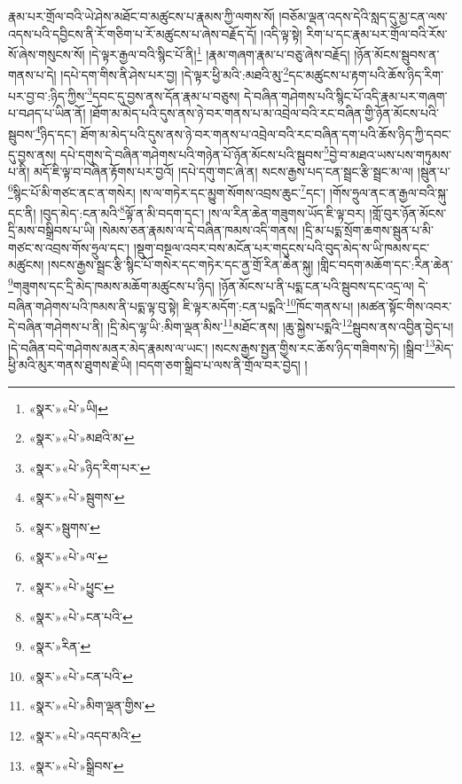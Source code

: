 རྣམ་པར་གྲོལ་བའི་ཡེ་ཤེས་མཐོང་བ་མཚུངས་པ་རྣམས་ཀྱི་ལགས་སོ། །བཅོམ་ལྡན་འདས་དེའི་སླད་དུ་མྱ་ངན་ལས་འདས་པའི་དབྱིངས་ནི་རོ་གཅིག་པ་རོ་མཚུངས་པ་ཞེས་བརྗོད་དོ། །འདི་ལྟ་སྟེ། རིག་པ་དང་རྣམ་པར་གྲོལ་བའི་རོས་སོ་ཞེས་གསུངས་སོ། །དེ་ལྟར་རྒྱལ་བའི་སྙིང་པོ་ནི།\footnote{«སྣར་»«པེ་»ཡི།} །རྣམ་གཞག་རྣམ་པ་བཅུ་ཞེས་བརྗོད། །ཉོན་མོངས་སྦུབས་ན་གནས་པ་དེ། །དཔེ་དག་གིས་ནི་ཤེས་པར་བྱ། །དེ་ལྟར་ཕྱི་མའི་:མཐའི་མུ་\footnote{«སྣར་»«པེ་»མཐའི་མ་}དང་མཚུངས་པ་རྟག་པའི་ཆོས་ཉིད་རིག་པར་བྱ་བ་:ཉིད་ཀྱིས་\footnote{«སྣར་»«པེ་»ཉིད་རིག་པར་}དབང་དུ་བྱས་ནས་དོན་རྣམ་པ་བཅུས། དེ་བཞིན་གཤེགས་པའི་སྙིང་པོ་འདི་རྣམ་པར་གཞག་པ་བཤད་པ་ཡིན་ནོ། །ཐོག་མ་མེད་པའི་དུས་ནས་ཉེ་བར་གནས་པ་མ་འབྲེལ་བའི་རང་བཞིན་གྱི་ཉོན་མོངས་པའི་སྦུབས་\footnote{«སྣར་»«པེ་»སྦུགས་}ཉིད་དང་། ཐོག་མ་མེད་པའི་དུས་ནས་ཉེ་བར་གནས་པ་འབྲེལ་བའི་རང་བཞིན་དག་པའི་ཆོས་ཉིད་ཀྱི་དབང་དུ་བྱས་ནས། དཔེ་དགུས་དེ་བཞིན་གཤེགས་པའི་གཉེན་པོ་ཉོན་མོངས་པའི་སྦུབས་\footnote{«སྣར་»སྦུགས་}བྱེ་བ་མཐའ་ཡས་པས་གཏུམས་པ་ནི། མདོ་ཇི་ལྟ་བ་བཞིན་རྟོགས་པར་བྱའོ། །དཔེ་དགུ་གང་ཞེ་ན། སངས་རྒྱས་པད་ངན་སྦྲང་རྩི་སྦྲང་མ་ལ། །སྦུན་པ་\footnote{«སྣར་»«པེ་»ལ་}སྙིང་པོ་མི་གཙང་ནང་ན་གསེར། །ས་ལ་གཏེར་དང་མྱུག་སོགས་འབྲས་ཆུང་\footnote{«སྣར་»«པེ་»ཕྱུང་}དང་། །གོས་ཧྲུལ་ནང་ན་རྒྱལ་བའི་སྐུ་དང་ནི། །བུད་མེད་:ངན་མའི་\footnote{«སྣར་»«པེ་»ངན་པའི་}ལྟོ་ན་མི་བདག་དང་། །ས་ལ་རིན་ཆེན་གཟུགས་ཡོད་ཇི་ལྟ་བར། །གློ་བུར་ཉོན་མོངས་དྲི་མས་བསྒྲིབས་པ་ཡི། །སེམས་ཅན་རྣམས་ལ་དེ་བཞིན་ཁམས་འདི་གནས། །དྲི་མ་པདྨ་སྲོག་ཆགས་སྦུན་པ་མི་གཙང་ས་འབྲས་གོས་ཧྲུལ་དང་། །སྡུག་བསྔལ་འབར་བས་མངོན་པར་གདུངས་པའི་བུད་མེད་ས་ཡི་ཁམས་དང་མཚུངས། །སངས་རྒྱས་སྦྲང་རྩི་སྙིང་པོ་གསེར་དང་གཏེར་དང་ནྱ་གྲོ་རིན་ཆེན་སྐུ། །གླིང་བདག་མཆོག་དང་:རིན་ཆེན་\footnote{«སྣར་»རིན་}གཟུགས་དང་དྲི་མེད་ཁམས་མཆོག་མཚུངས་པ་ཉིད། །ཉོན་མོངས་པ་ནི་པདྨ་ངན་པའི་སྦུབས་དང་འདྲ་ལ། དེ་བཞིན་གཤེགས་པའི་ཁམས་ནི་པདྨ་ལྟ་བུ་སྟེ། ཇི་ལྟར་མདོག་:ངན་པདྨའི་\footnote{«སྣར་»«པེ་»ངན་པའི་}ཁོང་གནས་པ། །མཚན་སྟོང་གིས་འབར་དེ་བཞིན་གཤེགས་པ་ནི། །དྲི་མེད་ལྷ་ཡི་:མིག་ལྡན་མིས་\footnote{«སྣར་»«པེ་»མིག་ལྡན་གྱིས་}མཐོང་ནས། །ཆུ་སྐྱེས་པདྨའི་\footnote{«སྣར་»«པེ་»འདབ་མའི་}སྦུབས་ནས་འབྱིན་བྱེད་པ། །དེ་བཞིན་བདེ་གཤེགས་མནར་མེད་རྣམས་ལ་ཡང་། །སངས་རྒྱས་སྤྱན་གྱིས་རང་ཆོས་ཉིད་གཟིགས་ཏེ། །སྒྲིབ་\footnote{«སྣར་»«པེ་»སྒྲིབས་}མེད་ཕྱི་མའི་མུར་གནས་ཐུགས་རྗེ་ཡི། །བདག་ཅག་སྒྲིབ་པ་ལས་ནི་གྲོལ་བར་བྱེད། །
